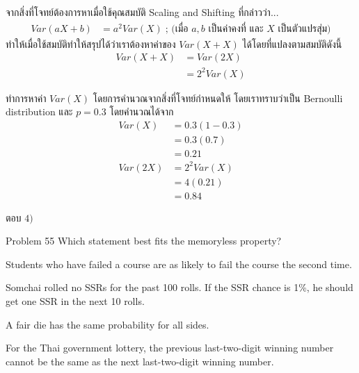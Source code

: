 \documentclass[11pt]{scrartcl}
\begin{document}
\begin{solutionbox}
  จากสิ่งที่โจทย์ต้องการหาเมื่อใช้คุณสมบัติ Scaling and Shifting ที่กล่าวว่า...
  \begin{align*}
    Var(aX+b) &= a^2Var(X) \; \text{; (เมื่อ $a,b$ เป็นค่าคงที่ และ $X$ เป็นตัวแปรสุ่ม)}
  \end{align*}
  ทำให้เมื่อใช้สมบัติทำให้สรุปได้ว่าเราต้องหาค่าของ $Var(X + X)$ ได้โดยที่แปลงตามสมบัติดังนี้
  \begin{align*}
    Var(X + X) &= Var(2X) \\
               &= 2^2Var(X)
  \end{align*}
  
  ทำการหาค่า $Var(X)$ โดยการคำนวณจากสิ่งที่โจทย์กำหนดให้ โดยเราทราบว่าเป็น Bernoulli distribution และ $p=0.3$ โดยคำนวณได้จาก
  \begin{align*}
    Var(X) &= 0.3(1-0.3) \\
           &= 0.3(0.7) \\
           &= 0.21 \\
    Var(2X) &= 2^2Var(X) \\
            &= 4(0.21) \\
            &= 0.84
  \end{align*}

  ตอบ $\boxed{4)}$
\end{solutionbox}

\begin{problembox}{Problem 55}
Which statement best fits the memoryless property?
 
\begin{choices}
\item Students who have failed a course are as likely to fail the course the second time.
\item Somchai rolled no SSRs for the past 100 rolls. If the SSR chance is 1\%, he should get one SSR in the next 10 rolls.
\item A fair die has the same probability for all sides.
\item For the Thai government lottery, the previous last-two-digit winning number cannot be the same as the next last-two-digit winning number.
\end{choices}
\end{problembox}
\end{document}
